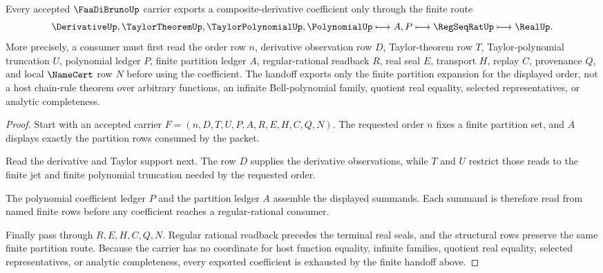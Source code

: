 \begin{theorem}
\label{thm:faa-di-bruno-finite-partition-handoff}
Every accepted $\FaaDiBrunoUp$ carrier exports a composite-derivative coefficient only through the finite route
$$
\DerivativeUp,\TaylorTheoremUp,\TaylorPolynomialUp,\PolynomialUp \longmapsto A,P \longmapsto \RegSeqRatUp \longmapsto \RealUp .
$$
More precisely, a consumer must first read the order row $n$, derivative observation row $D$, Taylor-theorem row $T$, Taylor-polynomial truncation $U$, polynomial ledger $P$, finite partition ledger $A$, regular-rational readback $R$, real seal $E$, transport $H$, replay $C$, provenance $Q$, and local $\NameCert$ row $N$ before using the coefficient. The handoff exports only the finite partition expansion for the displayed order, not a host chain-rule theorem over arbitrary functions, an infinite Bell-polynomial family, quotient real equality, selected representatives, or analytic completeness.
\end{theorem}
\begin{proof}
Start with an accepted carrier $F=(n,D,T,U,P,A,R,E,H,C,Q,N)$. The requested order $n$ fixes a finite partition set, and $A$ displays exactly the partition rows consumed by the packet.

Read the derivative and Taylor support next. The row $D$ supplies the derivative observations, while $T$ and $U$ restrict those reads to the finite jet and finite polynomial truncation needed by the requested order.

The polynomial coefficient ledger $P$ and the partition ledger $A$ assemble the displayed summands. Each summand is therefore read from named finite rows before any coefficient reaches a regular-rational consumer.

Finally pass through $R,E,H,C,Q,N$. Regular rational readback precedes the terminal real seals, and the structural rows preserve the same finite partition route. Because the carrier has no coordinate for host function equality, infinite families, quotient real equality, selected representatives, or analytic completeness, every exported coefficient is exhausted by the finite handoff above.
\end{proof}


